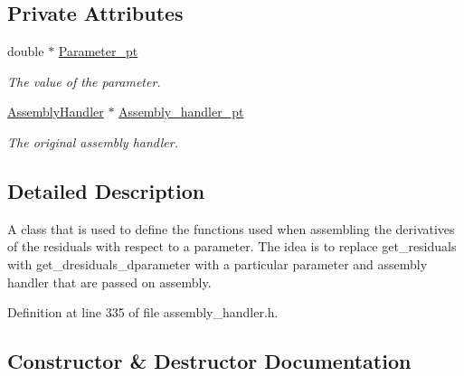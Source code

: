 \subsection*{Private Attributes}
\begin{DoxyCompactItemize}
\item 
double $\ast$ \hyperlink{classoomph_1_1ParameterDerivativeHandler_a4915174c5f1663bf9df2b0ba1cff56e6}{Parameter\+\_\+pt}
\begin{DoxyCompactList}\small\item\em The value of the parameter. \end{DoxyCompactList}\item 
\hyperlink{classoomph_1_1AssemblyHandler}{Assembly\+Handler} $\ast$ \hyperlink{classoomph_1_1ParameterDerivativeHandler_aaaf6a918c81462544d3ea1fbc108b8e8}{Assembly\+\_\+handler\+\_\+pt}
\begin{DoxyCompactList}\small\item\em The original assembly handler. \end{DoxyCompactList}\end{DoxyCompactItemize}


\subsection{Detailed Description}
A class that is used to define the functions used when assembling the derivatives of the residuals with respect to a parameter. The idea is to replace get\+\_\+residuals with get\+\_\+dresiduals\+\_\+dparameter with a particular parameter and assembly handler that are passed on assembly. 

Definition at line 335 of file assembly\+\_\+handler.\+h.



\subsection{Constructor \& Destructor Documentation}
\mbox{\label{classoomph_1_1ParameterDerivativeHandler_af9d8c24e7fdc34662086c66b759de2a6}} 
